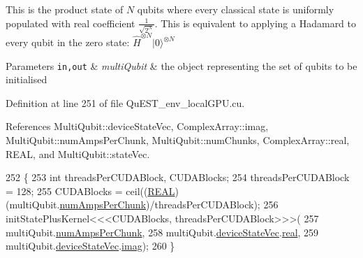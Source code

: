 This is the product state of $N$ qubits where every classical state is uniformly populated with real coefficient $\frac{1}{\sqrt{2^N}}$. This is equivalent to applying a Hadamard to every qubit in the zero state\+: $ \hat{H}^{\otimes N} {|0\rangle}^{\otimes N} $


\begin{DoxyParams}[1]{Parameters}
\mbox{\tt in,out}  & {\em multi\+Qubit} & the object representing the set of qubits to be initialised \\
\hline
\end{DoxyParams}


Definition at line 251 of file Qu\+E\+S\+T\+\_\+env\+\_\+local\+G\+P\+U.\+cu.



References Multi\+Qubit\+::device\+State\+Vec, Complex\+Array\+::imag, Multi\+Qubit\+::num\+Amps\+Per\+Chunk, Multi\+Qubit\+::num\+Chunks, Complex\+Array\+::real, R\+E\+AL, and Multi\+Qubit\+::state\+Vec.


\begin{DoxyCode}
252 \{
253     \textcolor{keywordtype}{int} threadsPerCUDABlock, CUDABlocks;
254     threadsPerCUDABlock = 128;
255     CUDABlocks = ceil((\mbox{\hyperlink{QuEST__precision_8h_a4b654506f18b8bfd61ad2a29a7e38c25}{REAL}})(multiQubit.\mbox{\hyperlink{structMultiQubit_a1cad83601a78635dd278259c7ed54f18}{numAmpsPerChunk}})/threadsPerCUDABlock);
256     initStatePlusKernel<<<CUDABlocks, threadsPerCUDABlock>>>(
257         multiQubit.\mbox{\hyperlink{structMultiQubit_a1cad83601a78635dd278259c7ed54f18}{numAmpsPerChunk}}, 
258         multiQubit.\mbox{\hyperlink{structMultiQubit_a59ac613486a41b8c9a4b6e79cc8d2cc3}{deviceStateVec}}.\mbox{\hyperlink{structComplexArray_a4195cac6c784ea1b6271f1c7dba1548a}{real}}, 
259         multiQubit.\mbox{\hyperlink{structMultiQubit_a59ac613486a41b8c9a4b6e79cc8d2cc3}{deviceStateVec}}.\mbox{\hyperlink{structComplexArray_a79dde47c7ae530c79cebfdf57b225968}{imag}});
260 \}
\end{DoxyCode}
\mbox{\label{QuEST__env__localGPU_8cu_abddc47ea8fe014ed09dc82542bcbfe6f}} 
